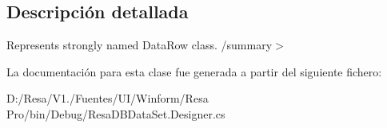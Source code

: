 \subsection{Descripción detallada}
Represents strongly named Data\+Row class. /summary$>$ 

La documentación para esta clase fue generada a partir del siguiente fichero\+:\begin{DoxyCompactItemize}
\item 
D\+:/\+Resa/\+V1./\+Fuentes/\+U\+I/\+Winform/\+Resa Pro/bin/\+Debug/Resa\+D\+B\+Data\+Set.\+Designer.\+cs\end{DoxyCompactItemize}
